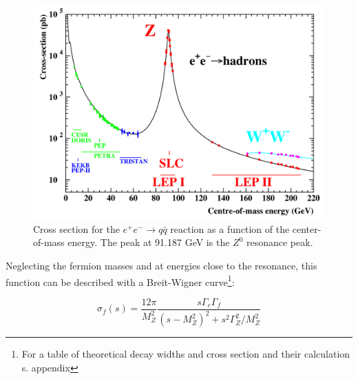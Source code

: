 \begin{figure}[htb]
\centering
\includegraphics[width=\linewidth]{graphics/crosssection}
\caption[Cross section as a function of CMS]{Cross section for the $e^+ e^- \rightarrow q \bar{q}$ reaction as a function of the center-of-mass energy. The peak at 91.187 GeV is the $Z^0$ resonance peak. \cite{jakobs}}
\label{fig:principles:crosssection}
\end{figure}

 Neglecting the fermion masses and at energies close to the resonance, this function can be described with a Breit-Wigner curve\footnote{For a table of theoretical decay widths and cross section and their calculation s. appendix}\cite{muenchen}:
 
\begin{equation}
\sigma_f(s) = \frac{12\pi}{M_Z^2} \frac{s\Gamma_e\Gamma_f}{(s-M_Z^2)^2+s^2\Gamma_Z^2/M_Z^2}
\label{eq:principles:breitwigner}
\end{equation}

